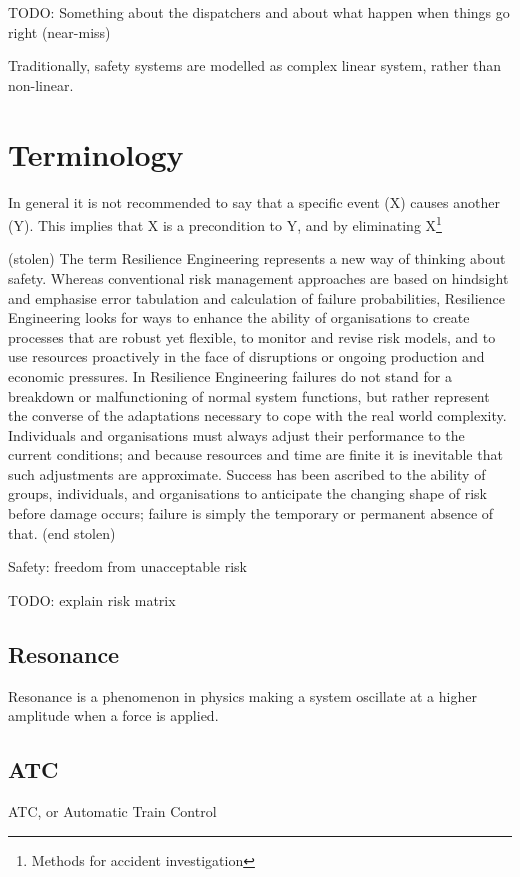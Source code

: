 
TODO: Something about the dispatchers and about what happen when things go right (near-miss)


Traditionally, safety systems are modelled as complex linear system, rather than non-linear.

\chapter{Terminology}
In general it is not recommended to say that a specific event (X) causes another (Y). This implies that X is a precondition to Y, and by eliminating X\footnote{Methods for accident investigation}

(stolen)
The term Resilience Engineering represents a new way of thinking about safety. Whereas conventional risk management approaches are based on hindsight and emphasise error tabulation and calculation of failure probabilities, Resilience Engineering looks for ways to enhance the ability of organisations to create processes that are robust yet flexible, to monitor and revise risk models, and to use resources proactively in the face of disruptions or ongoing production and economic pressures. In Resilience Engineering failures do not stand for a breakdown or malfunctioning of normal system functions, but rather represent the converse of the adaptations necessary to cope with the real world complexity. Individuals and organisations must always adjust their performance to the current conditions; and because resources and time are finite it is inevitable that such adjustments are approximate. Success has been ascribed to the ability of groups, individuals, and organisations to anticipate the changing shape of risk before damage occurs; failure is simply the temporary or permanent absence of that.
(end stolen)

Safety: freedom from unacceptable risk

TODO: explain risk matrix

\section{Resonance}

Resonance is a phenomenon in physics making a system oscillate at a higher amplitude when a force is applied.

\section{ATC}
ATC, or Automatic Train Control

